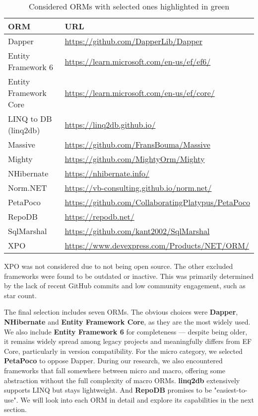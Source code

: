 \begin{table}[h]
\centering
\begin{tabular}{|l|l|}
\hline
\textbf{ORM} & \textbf{URL} \\
\hline
\cellcolor{lightgreen}Dapper & \url{https://github.com/DapperLib/Dapper} \\
\cellcolor{lightgreen}Entity Framework 6 & \url{https://learn.microsoft.com/en-us/ef/ef6/} \\
\cellcolor{lightgreen}Entity Framework Core & \url{https://learn.microsoft.com/en-us/ef/core/} \\
\cellcolor{lightgreen}LINQ to DB (linq2db) & \url{https://linq2db.github.io/} \\
Massive & \url{https://github.com/FransBouma/Massive} \\
Mighty & \url{https://github.com/MightyOrm/Mighty} \\
\cellcolor{lightgreen}NHibernate & \url{https://nhibernate.info/} \\
Norm.NET & \url{https://vb-consulting.github.io/norm.net/} \\
\cellcolor{lightgreen}PetaPoco & \url{https://github.com/CollaboratingPlatypus/PetaPoco} \\
\cellcolor{lightgreen}RepoDB & \url{https://repodb.net/} \\
SqlMarshal & \url{https://github.com/kant2002/SqlMarshal} \\
XPO & \url{https://www.devexpress.com/Products/NET/ORM/} \\
\hline
\end{tabular}
\caption{Considered ORMs with selected ones highlighted in green\label{tab:orm-docs}}
\end{table}

XPO was not considered due to not being open source. The other excluded frameworks were found to be outdated or inactive. This was primarily determined by the lack of recent GitHub commits and low community engagement, such as star count. 

The final selection includes seven ORMs. The obvious choices were \textbf{Dapper}, \textbf{NHibernate} and \textbf{Entity Framework Core}, as they are the most widely used. We also include \textbf{Entity Framework 6} for completeness --- despite being older, it remains widely spread among legacy projects and meaningfully differs from EF Core, particularly in version compatibility. For the micro category, we selected \textbf{PetaPoco} to oppose Dapper. During our research, we also encountered frameworks that fall somewhere between micro and macro, offering some abstraction without the full complexity of macro ORMs. \textbf{linq2db} extensively supports LINQ but stays lightweight. And \textbf{RepoDB} promises to be "easiest-to-use"\cite{RepoDB}. We will look into each ORM in detail and explore its capabilities in the next section.